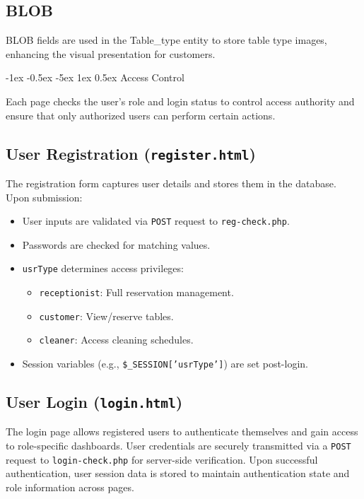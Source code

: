 \documentclass[12pt]{article}
\makeatletter
\renewcommand\section{\@startsection{section}{1}{\z@}%
    {-1ex \@plus -0.5ex \@minus -5ex} %
    {1ex \@plus 0.5ex} %
    {\normalfont\Large\bfseries}} %
\makeatother
\begin{document}
\subsection{BLOB}
BLOB fields are used in the Table\_type entity to store table type images, enhancing the visual presentation for customers.


\section{Access Control}

Each page checks the user's role and login status to control access authority and ensure that only authorized users can perform certain actions.

\subsection{User Registration (\texttt{register.html})}

The registration form captures user details and stores them in the database. Upon submission:

\begin{itemize}
    \item User inputs are validated via \texttt{POST} request to \texttt{reg-check.php}.
    \item Passwords are checked for matching values.
    \item \texttt{usrType} determines access privileges:
    \begin{itemize}
        \item \texttt{receptionist}: Full reservation management.
        \item \texttt{customer}: View/reserve tables.
        \item \texttt{cleaner}: Access cleaning schedules.
    \end{itemize}
    \item Session variables (e.g., \texttt{\$\_SESSION['usrType']}) are set post-login.
\end{itemize}

\subsection{User Login (\texttt{login.html})}

The login page allows registered users to authenticate themselves and gain access to role-specific dashboards. User credentials are securely transmitted via a \texttt{POST} request to \texttt{login-check.php} for server-side verification. Upon successful authentication, user session data is stored to maintain authentication state and role information across pages.
\end{document}
